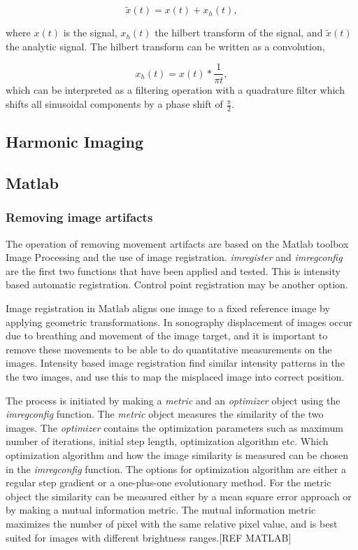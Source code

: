 \begin{equation}
\tilde{x}(t) = x(t) + x_h(t),
\end{equation}

where $x(t)$ is the signal, $x_h(t)$ the hilbert transform of the signal, and $\tilde{x}(t)$ the analytic signal. The hilbert transform can be written as a convolution, 

\begin{equation}
x_h(t) = x(t)*\frac{1}{\pi t},
\end{equation}
which can be interpreted as a filtering operation with a quadrature filter which shifts all sinusoidal components by a phase shift of $\frac{\pi}{2}$.

\subsection{Harmonic Imaging}

\subsection{Matlab}
\subsubsection{Removing image artifacts}
The operation of removing movement artifacts are based on the Matlab toolbox Image Processing and the use of image registration. \textit{imregister} and \textit{imregconfig} are the first two functions that have been applied and tested. This is intensity based automatic registration. Control point registration may be another option.

Image registration in Matlab aligns one image to a fixed reference image by applying geometric transformations. In sonography displacement of images occur due to breathing and movement of the image target, and it is important to remove these movements to be able to do quantitative measurements on the images. Intensity based image registration find similar intensity patterns in the    the two images, and use this to map the misplaced image into correct position. 

The process is initiated by making a \textit{metric} and an \textit{optimizer} object using the \textit{imregconfig} function. The \textit{metric} object measures the similarity of the two images. The \textit{optimizer} contains the optimization parameters such as maximum number of iterations, initial step length, optimization algorithm etc. Which optimization algorithm and how the image similarity is measured can be chosen in the \textit{imregconfig} function. The options for optimization algorithm are either a regular step gradient or a one-plus-one evolutionary method. For the metric object the similarity can be measured either by a mean square error approach or by making a mutual information metric. The mutual information metric maximizes the number of pixel with the same relative pixel value, and is best suited for images with different brightness ranges.[REF MATLAB]










